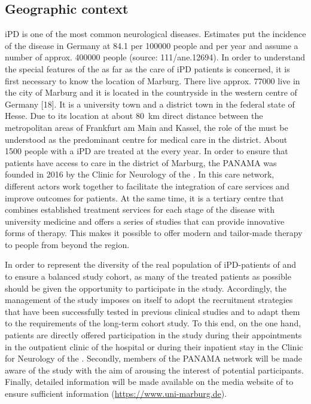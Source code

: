 \subsection{Geographic context}
\ac{iPD} is one of the most common neurological diseases. Estimates put the incidence of the disease in Germany at \SI{84.1}{} per \SI{100000}{} people and per year and assume a number of approx. \SI{400000}{} people (source: 111/ane.12694). In order to understand the special features of the \UKGM as far as the care of \ac{iPD} patients is concerned, it is first necessary to know the location of Marburg. There live approx. \SI{77000}{} live in the city of Marburg and it is located in the countryside in the western centre of Germany [18]. It is a university town and a district town in the federal state of Hesse. Due to its location at about \SI{80}{\km} direct distance between the metropolitan areas of Frankfurt am Main and Kassel, the role of the \UKGM must be understood as the predominant centre for medical care in the district. About \SI{1500}{} people with a \ac{iPD} are treated at the \UKGM every year. In order to ensure that patients have access to care in the district of Marburg, the \ac{PANAMA} was founded in 2016 by the Clinic for Neurology of the \UKGM. In this care network, different actors work together to facilitate the integration of care services and improve outcomes for patients. At the same time, it is a tertiary centre that combines established treatment services for each stage of the disease with university medicine and offers a series of studies that can provide innovative forms of therapy. This makes it possible to offer modern and tailor-made therapy to people from beyond the region.

In order to represent the diversity of the real population of \ac{iPD}-patients of \UKGM and to ensure a balanced study cohort, as many of the treated patients as possible should be given the opportunity to participate in the study. Accordingly, the management of the study imposes on itself to adopt the recruitment strategies that have been successfully tested in previous clinical studies and to adapt them to the requirements of the long-term cohort study. To this end, on the one hand, patients are directly offered participation in the study during their appointments in the outpatient clinic of the hospital or during their inpatient stay in the Clinic for Neurology of the \UKGM. Secondly, members of the \ac{PANAMA} network will be made aware of the study with the aim of arousing the interest of potential participants. Finally, detailed information will be made available on the media website of \UKGM to ensure sufficient information (\url{https://www.uni-marburg.de}).


